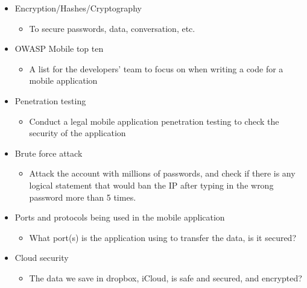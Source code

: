 \documentclass{article}
\begin{document}
\begin{itemize}
   \item Encryption/Hashes/Cryptography
   \begin{itemize}
       \item To secure passwords, data, conversation, etc.
   \end{itemize}
   \item OWASP Mobile top ten
   \begin{itemize}
       \item A list for the developers' team to focus on when writing a code for a mobile application
   \end{itemize}
   \item Penetration testing
   \begin{itemize}
       \item Conduct a legal mobile application penetration testing to check the security of the application
   \end{itemize}
   \item Brute force attack
   \begin{itemize}
       \item Attack the account with millions of passwords, and check if there is any logical statement that would ban the IP after typing in the wrong password more than 5 times.
   \end{itemize}
   \item Ports and protocols being used in the mobile application
   \begin{itemize}
       \item What port(s) is the application using to transfer the data, is it secured?
   \end{itemize}
   \item Cloud security
   \begin{itemize}
       \item The data we save in dropbox, iCloud, is safe and secured, and encrypted?
   \end{itemize}
   
 \end{itemize}
\end{document}
